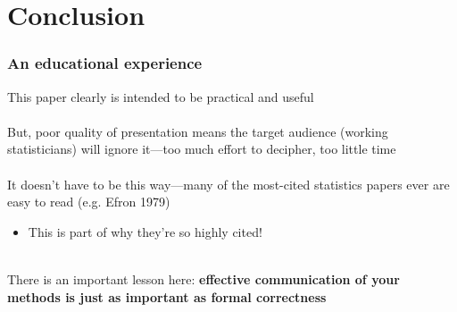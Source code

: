 \documentclass{beamer}
\begin{document}
	     \section{Conclusion}
	     \begin{frame}
		     \frametitle{An educational experience}
		     This paper clearly is intended to be practical and useful
		     \\~\\

		     But, poor quality of presentation means the target
		     audience (working statisticians) will ignore it---too much
		     effort to decipher, too little time \\~\\

		     It doesn't have to be this way---many of the most-cited
		     statistics papers ever are easy to read (e.g. Efron
		     1979)
		     \begin{itemize}
			     \item \small This is part of why they're so highly
				     cited!\\~\\
		     \end{itemize}

		     There is an important lesson here: \textbf{effective
		     communication of your methods is just as important as
		     formal correctness}
	     \end{frame}
\end{document}
